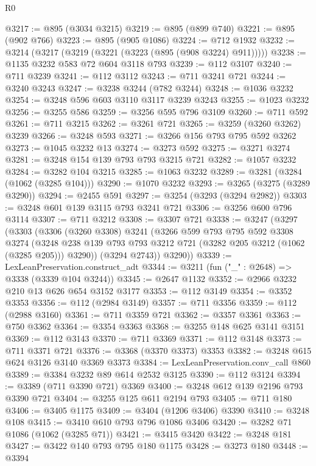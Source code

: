 \begin{lexlean}{R0}
\begin{coremodule}
@3217 := @895 (@3034 @3215)
@3219 := @895 (@899 @740)
@3221 := @895 (@902 @766)
@3223 := @895 (@905 @1086)
@3224 := @712 @1932
@3232 := @3214 (@3217 (@3219 (@3221 (@3223 (@895 (@908 @3224) @911)))))
@3238 := @1135 @3232 @583 @72 @604 @3118 @793
@3239 := @112 @3107
@3240 := @711 @3239
@3241 := @112 @3112
@3243 := @711 @3241 @721
@3244 := @3240 @3243
@3247 := @3238 @3244 (@782 @3244)
@3248 := @1036 @3232
@3254 := @3248 @596 @603 @3110 @3117 @3239 @3243
@3255 := @1023 @3232
@3256 := @3255 @586
@3259 := @3256 @595 @796 @3109
@3260 := @711 @592
@3261 := @711 @3215
@3262 := @3261 @721
@3265 := @3259 (@3260 @3262) @3239
@3266 := @3248 @593
@3271 := @3266 @156 @793 @795 @592 @3262
@3273 := @1045 @3232 @13
@3274 := @3273 @592
@3275 := @3271 @3274
@3281 := @3248 @154 @139 @793 @793 @3215 @721
@3282 := @1057 @3232
@3284 := @3282 @104 @3215
@3285 := @1063 @3232
@3289 := @3281 (@3284 (@1062 (@3285 @104)))
@3290 := @1070 @3232
@3293 := @3265 (@3275 (@3289 @3290))
@3294 := @2455 @591
@3297 := @3254 (@3293 (@3294 @2982))
@3303 := @3248 @601 @139 @3115 @793 @3241 @721
@3306 := @3256 @600 @796 @3114
@3307 := @711 @3212
@3308 := @3307 @721
@3338 := @3247
    (@3297
      (@3303
        (@3306
          (@3260 @3308)
          @3241
          (@3266
            @599
            @793
            @795
            @592
            @3308
            @3274
            (@3248 @238 @139 @793 @793 @3212 @721 (@3282 @205 @3212 (@1062 (@3285 @205))) @3290))
          (@3294 @2743))
        @3290))
@3339 := LexLeanPreservation.construct_adt
@3344 := @3211 (fun ("_" : @2648) => @3338 (@3339 @104 @3244))
@3345 := @2647 @1132
@3352 := @2966 @3232 @210 @13 @626 @654 @3152 @3177
@3353 := @112 @3149
@3354 := @3352 @3353
@3356 := @112 (@2984 @3149)
@3357 := @711 @3356
@3359 := @112 (@2988 @3160)
@3361 := @711 @3359 @721
@3362 := @3357 @3361
@3363 := @750 @3362
@3364 := @3354 @3363
@3368 := @3255 @148 @625 @3141 @3151
@3369 := @112 @3143
@3370 := @711 @3369
@3371 := @112 @3148
@3373 := @711 @3371 @721
@3376 := @3368 (@3370 @3373) @3353
@3382 := @3248 @615 @624 @3126 @3140 @3369 @3373
@3384 := LexLeanPreservation.conv_call @860
@3389 := @3384 @3232 @89 @614 @2532 @3125
@3390 := @112 @3124
@3394 := @3389 (@711 @3390 @721) @3369
@3400 := @3248 @612 @139 @2196 @793 @3390 @721
@3404 := @3255 @125 @611 @2194 @793
@3405 := @711 @180
@3406 := @3405 @1175
@3409 := @3404 (@1206 @3406) @3390
@3410 := @3248 @108
@3415 := @3410 @610 @793 @796 @1086 @3406
@3420 := @3282 @71 @1086 (@1062 (@3285 @71))
@3421 := @3415 @3420
@3422 := @3248 @181
@3427 := @3422 @140 @793 @795 @180 @1175
@3428 := @3273 @180
@3448 := @3394

\end{coremodule}
\end{lexlean}
